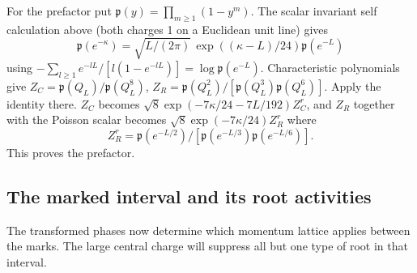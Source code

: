 For the prefactor put \(\mathfrak p(y)=\prod_{m\ge1}(1-y^m)\). The scalar invariant self calculation above (both charges 1 on a Euclidean unit line) gives
\[
 \mathfrak p(e^{-\kappa})=\sqrt{L/(2\pi)}\,\exp((\kappa-L)/24)\mathfrak p(e^{-L})
\]
using \(-\sum_{l\ge1} e^{-lL}/[l(1-e^{-lL})]=\log\mathfrak p(e^{-L})\). Characteristic polynomials give \(Z_C=\mathfrak p(Q_L)/\mathfrak p(Q_L^8)\), \(Z_R=\mathfrak p(Q_L^2)/[\mathfrak p(Q_L^3)\mathfrak p(Q_L^6)]\). Apply the identity there. \(Z_C\) becomes \(\sqrt{8}\exp(-7\kappa/24-7L/192)Z_C^r\), and \(Z_R\) together with the Poisson scalar becomes \(\sqrt{8}\exp(-7\kappa/24)Z_R^r\) where 
\[Z_R^r=\mathfrak p(e^{-L/2})/[\mathfrak p(e^{-L/3})\mathfrak p(e^{-L/6})].\]
This proves the prefactor.

\subsection{The marked interval and its root activities}

The transformed phases now determine which momentum lattice applies between the marks. The large central charge will suppress all but one type of root in that interval.

